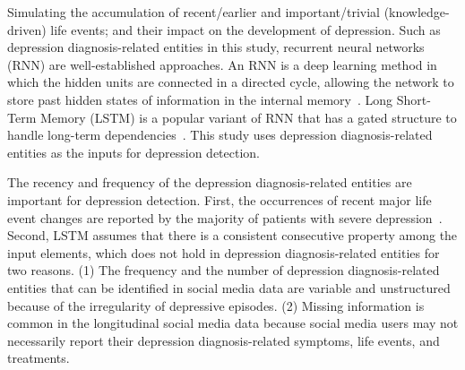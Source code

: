 
Simulating the accumulation of recent/earlier and important/trivial (knowledge-driven) life events; and their impact on the development of depression. Such as depression diagnosis-related entities in this study, recurrent neural networks (RNN) are well-established approaches. An RNN is a deep learning method in which the hidden units are connected in a directed cycle, allowing the network to store past hidden states of information in the internal memory~. Long Short-Term Memory (LSTM) is a popular variant of RNN that has a gated structure to handle long-term dependencies~. This study uses depression diagnosis-related entities as the inputs for depression detection. 

The recency and frequency of the depression diagnosis-related entities are important for depression detection. First, the occurrences of recent major life event changes are reported by the majority of patients with severe depression~. Second, LSTM assumes that there is a consistent consecutive property among the input elements, which does not hold in depression diagnosis-related entities for two reasons. (1) The frequency and the number of depression diagnosis-related entities that can be identified in social media data are variable and unstructured because of the irregularity of depressive episodes. (2) Missing information is common in the longitudinal social media data because social media users may not necessarily report their depression diagnosis-related symptoms, life events, and treatments. 

